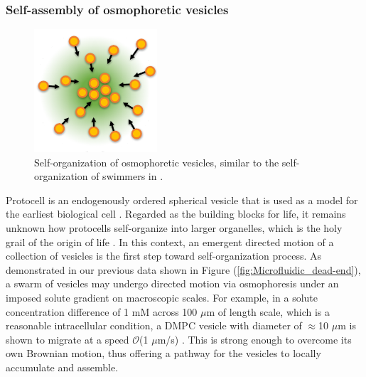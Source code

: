 \documentclass[11pt]{article}
\begin{document}
\subsubsection{Self-assembly of osmophoretic vesicles \label{subsubsec:self-assembly}}
\begin{figure}
\vspace*{-15pt}
\centerline{\includegraphics[width=1.8in]{figs/self-organization.pdf}}
\vspace*{-15pt}
\caption{\footnotesize Self-organization of osmophoretic vesicles, similar to the self-organization of swimmers in \cite{Nikolov2016_COCIS}.}
\label{fig:self-organization}
\end{figure}
%
Protocell is an endogenously ordered spherical vesicle that is used as a model for the earliest biological cell \cite{chen2010}.
Regarded as the building blocks for life, it remains unknown how protocells self-organize into larger organelles, which is the holy
grail of the origin of life \cite{shklyaev2016}. In this context, an emergent directed motion of a collection of vesicles is the first step toward self-organization process. 
As demonstrated in our previous data shown in Figure (\ref{fig:Microfluidic_dead-end}), a swarm of vesicles may undergo directed motion via osmophoresis under an imposed
solute gradient on macroscopic scales.
For example, in a solute concentration difference of 1 mM across 100 $\mu$m of length scale, which is a reasonable intracellular condition, 
a DMPC vesicle with diameter of $\approx$10 $\mu$m is shown to migrate at a speed $\mathcal{O}$(1 $\mu$m/s) \cite{nardi1999}. This is strong enough to overcome its own Brownian motion, thus offering a pathway for the vesicles to locally accumulate and assemble.
\end{document}
